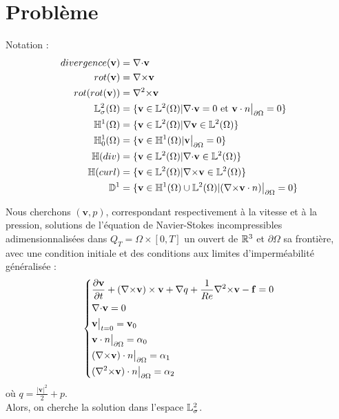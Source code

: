 \section{Problème}
Notation :
\begin{align*}
divergence(\mathbf{v})&={\nabla\cdot} \mathbf{v}\\
rot(\mathbf{v})&={\nabla\times} \mathbf{v}\\
rot(rot(\mathbf{v}))&={\nabla^2\times} \mathbf{v}\\
{\mathbb{L}}^2_\sigma(\Omega) &= \{\mathbf{v} \in {\mathbb{L}}^2(\Omega) | {\nabla\cdot} \mathbf{v} = 0\text{ et }\mathbf{v}\cdot n{\big\rvert_{\partial\Omega}} = 0 \}\\
{\mathbb{H}}^1(\Omega) &= \{\mathbf{v} \in {\mathbb{L}}^2(\Omega) | {\nabla} \mathbf{v}\in{\mathbb{L}}^2(\Omega)\}\\
{\mathbb{H}}^1_0(\Omega) &= \{\mathbf{v} \in {\mathbb{H}}^1(\Omega) | \mathbf{v}{\big\rvert_{\partial\Omega}} = 0\}\\
{\mathbb{H}}(div) &= \{\mathbf{v} \in {\mathbb{L}}^2(\Omega) | {\nabla\cdot}\mathbf{v} \in {\mathbb{L}}^2(\Omega) \}\\
{\mathbb{H}}(curl) &= \{\mathbf{v} \in {\mathbb{L}}^2(\Omega) | {\nabla\times}\mathbf{v} \in {\mathbb{L}}^2(\Omega) \}\\
{\mathbb{D}}^1 &= \{\mathbf{v} \in {\mathbb{H}}^1(\Omega)\cup {\mathbb{L}}^2(\Omega) | ({\nabla\times} \mathbf{v}\cdot n){\big\rvert_{\partial\Omega}} = 0  \}
\end{align*}

Nous cherchons $(\mathbf{v},p)$, correspondant respectivement à la vitesse et à la pression, solutions de l'équation de Navier-Stokes incompressibles adimensionnalisées dans $Q_T=\Omega\times[0,T]$ un ouvert de ${\mathbb{R}}^3$ et $\partial\Omega$ sa frontière, avec une condition initiale et des conditions aux limites d'imperméabilité généralisée :
\begin{equation}
\label{depart}
\left\{
\begin{aligned}
&\frac{\partial \mathbf{v}}{\partial t} + ({\nabla\times}  \mathbf{v})\times \mathbf{v} + {\nabla} q + \frac{1}{Re}{\nabla^2\times}  \mathbf{v}-\mathbf{f} = 0\\
&{\nabla\cdot} \mathbf{v} = 0\\
&\mathbf{v}\big\rvert_{t=0} = \mathbf{v}_0\\
&\mathbf{v}\cdot n{\big\rvert_{\partial\Omega}} = \alpha_0\\
&({\nabla\times}  \mathbf{v})\cdot n{\big\rvert_{\partial\Omega}} = \alpha_1\\
&({\nabla^2\times}  \mathbf{v})\cdot n{\big\rvert_{\partial\Omega}} = \alpha_2
\end{aligned}
\right.
\end{equation}
où $q = \frac{|\mathbf{v}|^2}{2}+p$.\\
Alors, on cherche la solution dans l'espace ${\mathbb{L}}^2_\sigma$.\\

